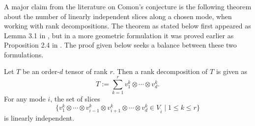 \documentclass[../Lael_John_MasterThesis_Draft.tex]{subfiles}
\begin{document}
A major claim from the literature on Comon's conjecture is the following theorem about the number of linearly independent slices along a chosen mode, when working with rank decompositions. The theorem as stated below first appeared as Lemma 3.1 in \cite{zhang_comons_2016}, but in a more geometric formulation it was proved earlier as Proposition 2.4 in \cite{buczynski_ranks_2013}. The proof given below seeks a balance between these two formulations.
\begin{theorem}\label{thm:ranklinearindependentslices}
    Let $T$ be an order-$d$ tensor of rank $r$. Then a rank decomposition of $T$ is given as $$T := \sum_{k=1}^{r} v_1^k \otimes \cdots \otimes v_d^k.$$ For any mode $i$, the set of slices $$\{ v_1^k \otimes \cdots\otimes v_{i-1}^k \otimes v_{i+1}^k \otimes \cdots \otimes v_d^k \in V_{\hat{i}} \;|\; 1 \leq k \leq r \}$$ is linearly independent.
\end{theorem}
\end{document}
